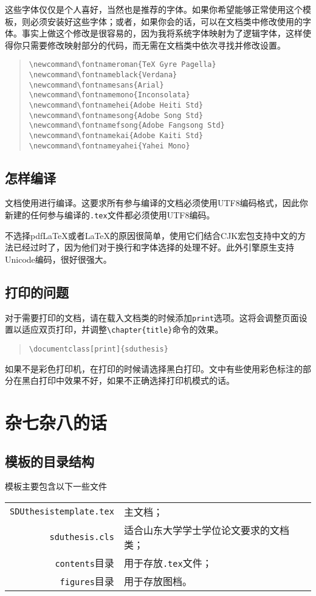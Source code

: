 这些字体仅仅是个人喜好，当然也是推荐的字体。如果你希望能够正常使用这个模板，则必须安装好这些字体；或者，如果你会的话，可以在文档类中修改使用的字体。事实上做这个修改是很容易的，因为我将系统字体映射为了逻辑字体，这样使得你只需要修改映射部分的代码，而无需在文档类中依次寻找并修改设置。
\begin{quote}
\begin{verbatim}
\newcommand\fontnameroman{TeX Gyre Pagella}
\newcommand\fontnameblack{Verdana}
\newcommand\fontnamesans{Arial}
\newcommand\fontnamemono{Inconsolata}
\newcommand\fontnamehei{Adobe Heiti Std}
\newcommand\fontnamesong{Adobe Song Std}
\newcommand\fontnamefsong{Adobe Fangsong Std}
\newcommand\fontnamekai{Adobe Kaiti Std}  
\newcommand\fontnameyahei{Yahei Mono}
\end{verbatim}
\end{quote}
\section{怎样编译}
\label{section:howtocompile}
文档使用\XeLaTeX{}进行编译。这要求所有参与编译的文档必须使用UTF8编码格式，因此你新建的任何参与编译的\texttt{.tex}文件都必须使用UTF8编码。

不选择pdf\LaTeX{}或者\LaTeX{}的原因很简单，使用它们结合CJK宏包支持中文的方法已经过时了，因为他们对于换行和字体选择的处理不好。此外\XeTeX{}引擎原生支持Unicode编码，很好很强大。
\section{打印的问题}
对于需要打印的文档，请在载入文档类的时候添加\texttt{print}选项。这将会调整页面设置以适应双页打印，并调整\verb|\chapter{title}|命令的效果。
\begin{quote}
\begin{verbatim}
\documentclass[print]{sduthesis}
\end{verbatim}
\end{quote}

如果不是彩色打印机，在打印的时候请选择黑白打印。文中有些使用彩色标注的部分在黑白打印中效果不好，如果不正确选择打印机模式的话。
\chapter{杂七杂八的话}
\section{模板的目录结构}
模板主要包含以下一些文件
\begin{center}
\begin{tabular}
{rl}
\toprule
\texttt{SDUthesistemplate.tex}& 主文档；\\
\texttt{sduthesis.cls}& 适合山东大学学士学位论文要求的文档类；\\
\texttt{contents}目录& 用于存放\texttt{.tex}文件；\\
\texttt{figures}目录& 用于存放图档。\\
\bottomrule
\end{tabular}
\end{center}

